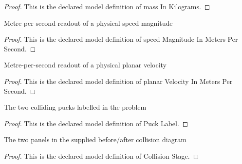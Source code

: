 \begin{proof}
  This is the declared model definition of mass In Kilograms.
\end{proof}
\begin{definition}
  \label{def:physics:phyx-mini-0816:phyxminiproblems-problemphyxmini0816-speedmagnitudeinmeterspersecond}
  Metre-per-second readout of a physical speed magnitude
\end{definition}
\begin{proof}
  This is the declared model definition of speed Magnitude In Meters Per Second.
\end{proof}
\begin{definition}
  \label{def:physics:phyx-mini-0816:phyxminiproblems-problemphyxmini0816-planarvelocityinmeterspersecond}
  Metre-per-second readout of a physical planar velocity
\end{definition}
\begin{proof}
  This is the declared model definition of planar Velocity In Meters Per Second.
\end{proof}
\begin{definition}
  \label{def:physics:phyx-mini-0816:phyxminiproblems-problemphyxmini0816-pucklabel}
  The two colliding pucks labelled in the problem
\end{definition}
\begin{proof}
  This is the declared model definition of Puck Label.
\end{proof}
\begin{definition}
  \label{def:physics:phyx-mini-0816:phyxminiproblems-problemphyxmini0816-collisionstage}
  The two panels in the supplied before/after collision diagram
\end{definition}
\begin{proof}
  This is the declared model definition of Collision Stage.
\end{proof}

